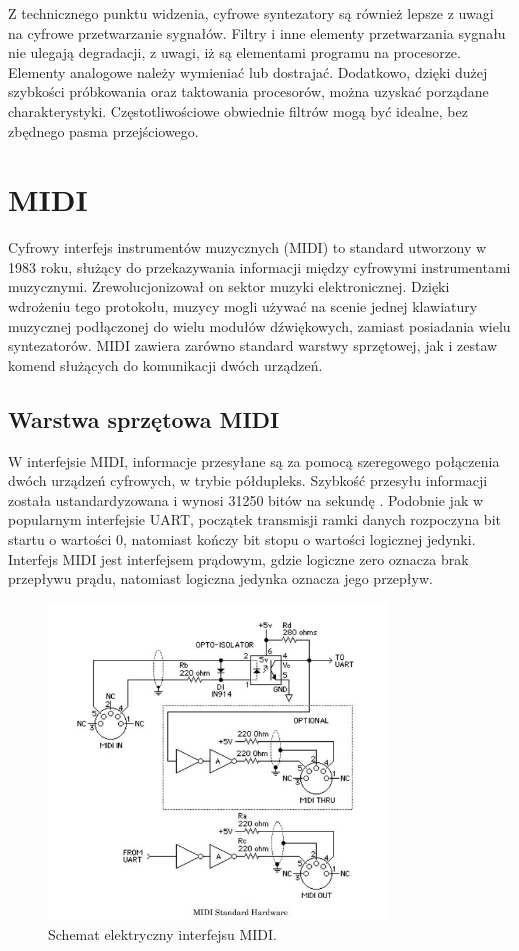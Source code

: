 Z technicznego punktu widzenia, cyfrowe syntezatory są również lepsze z uwagi na cyfrowe przetwarzanie sygnałów. Filtry i inne elementy przetwarzania sygnału nie ulegają degradacji, z uwagi, iż są elementami programu na procesorze. Elementy analogowe należy wymieniać lub dostrajać. Dodatkowo, dzięki dużej szybkości próbkowania oraz taktowania procesorów, można uzyskać porządane charakterystyki. Częstotliwościowe obwiednie filtrów mogą być idealne, bez zbędnego pasma przejściowego.


\section{MIDI}
Cyfrowy interfejs instrumentów muzycznych (MIDI) to standard utworzony w 1983 roku, służący do przekazywania informacji między cyfrowymi instrumentami muzycznymi. Zrewolucjonizował on sektor muzyki elektronicznej. Dzięki wdrożeniu tego protokołu, muzycy mogli używać na scenie jednej klawiatury muzycznej podłączonej do wielu modułów dźwiękowych, zamiast posiadania wielu syntezatorów. MIDI zawiera zarówno standard warstwy sprzętowej, jak i zestaw komend służących do komunikacji dwóch urządzeń.

\subsection{Warstwa sprzętowa MIDI}
W interfejsie MIDI, informacje przesyłane są za pomocą szeregowego połączenia dwóch urządzeń cyfrowych, w trybie półdupleks. Szybkość przesyłu informacji została ustandardyzowana i wynosi 31250 bitów na sekundę \cite{dokumentacja_midi}. Podobnie jak w popularnym interfejsie UART, początek transmisji ramki danych rozpoczyna bit startu o wartości 0, natomiast kończy bit stopu o wartości logicznej jedynki. Interfejs MIDI jest interfejsem prądowym, gdzie logiczne zero oznacza brak przepływu prądu, natomiast logiczna jedynka oznacza jego przepływ.

\begin{figure}[H]
	\centering
	\includegraphics[width=9cm]{./grafiki/hardware_midi}
	\captionsetup{justification=centering}
	\caption{Schemat elektryczny interfejsu MIDI.}
	\label{rys:hardware_midi}
\end{figure}

